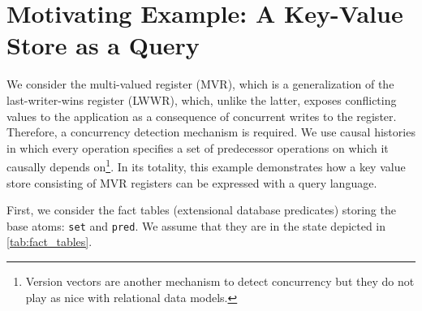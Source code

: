 \documentclass{article}
\newcommand{\code}[1]{\texttt{#1}}
\begin{document}
\section{Motivating Example: A Key-Value Store as a Query}
\label{sec:motivating_example}

We consider the multi-valued register (MVR), which is a generalization of
the last-writer-wins register (LWWR), which, unlike the latter,
exposes conflicting values to the application
as a consequence of concurrent writes to the register.
Therefore, a concurrency detection mechanism is required.
We use causal histories in which every operation specifies a set of
predecessor operations on which it causally depends on\footnote{
	Version vectors are another mechanism to detect concurrency
	but they do not play as nice with relational data models.}.
In its totality, this example demonstrates how a key value store
consisting of MVR registers can be expressed with a query language.

First, we consider the fact tables (extensional database predicates) storing
the base atoms: \code{set} and \code{pred}.
We assume that they are in the state depicted in \autoref{tab:fact_tables}.

\end{document}
